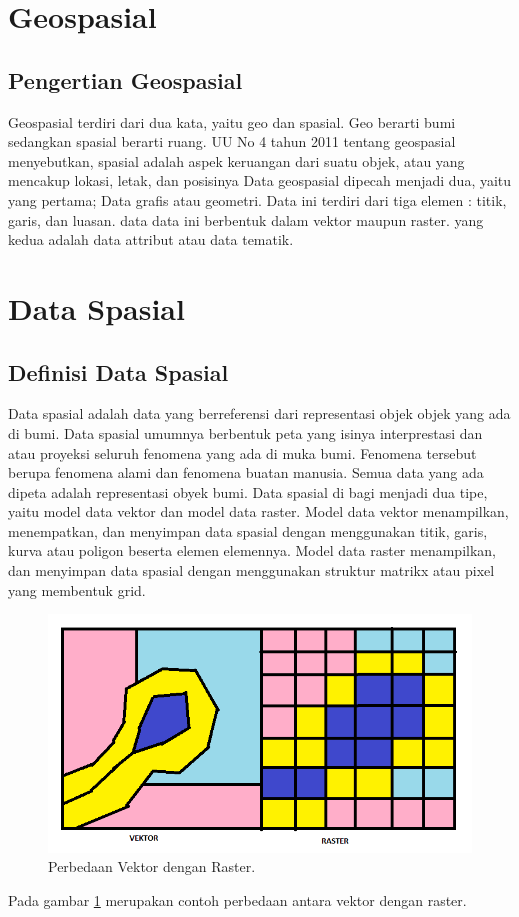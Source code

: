 \section{Geospasial}
\subsection{Pengertian Geospasial}
Geospasial terdiri dari dua kata, yaitu geo dan spasial. Geo berarti bumi sedangkan spasial berarti 
ruang. UU No 4 tahun 2011 tentang geospasial menyebutkan, spasial adalah aspek keruangan dari suatu objek, 
atau yang mencakup lokasi, letak, dan posisinya
Data geospasial dipecah menjadi dua, yaitu yang pertama; Data grafis atau geometri. Data ini terdiri dari
tiga elemen : titik, garis, dan luasan. data data ini berbentuk dalam vektor maupun raster. yang kedua
adalah data attribut atau data tematik.

\section{Data Spasial}
\subsection{Definisi Data Spasial}
Data spasial adalah data yang berreferensi dari representasi objek objek yang ada di bumi.
Data spasial umumnya berbentuk peta yang isinya interprestasi dan atau proyeksi seluruh 
fenomena yang ada di muka bumi. Fenomena tersebut berupa fenomena alami dan fenomena 
buatan manusia. Semua data yang ada dipeta adalah representasi obyek bumi.
Data spasial di bagi menjadi dua tipe, yaitu model data vektor dan model data raster. 
Model data vektor menampilkan, menempatkan, dan menyimpan data spasial dengan menggunakan 
titik, garis, kurva atau poligon beserta elemen elemennya. Model data raster menampilkan,
dan menyimpan data spasial dengan menggunakan struktur matrikx atau pixel yang membentuk grid.

\begin{figure}[ht]
	\centerline{\includegraphics[width=1\textwidth]{figures/vektorraster.PNG}}
	\caption{Perbedaan Vektor dengan Raster.}
	\label{vektorraster}
	\end{figure}
Pada gambar \ref{vektorraster} merupakan contoh perbedaan antara vektor dengan raster.

